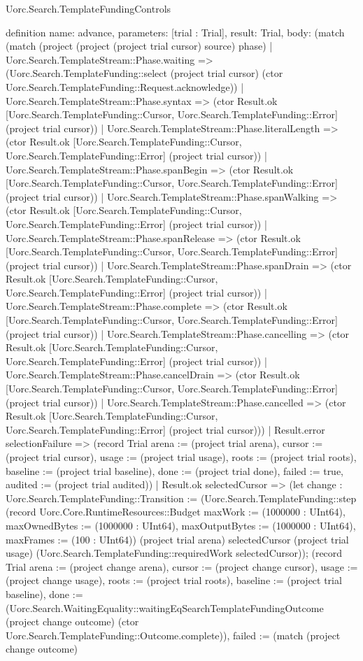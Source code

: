 \begin{lexlean}{Uorc.Search.TemplateFundingControls}
\begin{semanticmodule}
definition{
  name: advance,
  parameters: [trial : Trial],
  result: Trial,
  body: (match (match (project (project (project trial cursor) source) phase)
      | Uorc.Search.TemplateStream::Phase.waiting => (Uorc.Search.TemplateFunding::select (project trial cursor) (ctor Uorc.Search.TemplateFunding::Request.acknowledge))
      | Uorc.Search.TemplateStream::Phase.syntax => (ctor Result.ok [Uorc.Search.TemplateFunding::Cursor, Uorc.Search.TemplateFunding::Error] (project trial cursor))
      | Uorc.Search.TemplateStream::Phase.literalLength => (ctor Result.ok [Uorc.Search.TemplateFunding::Cursor, Uorc.Search.TemplateFunding::Error] (project trial cursor))
      | Uorc.Search.TemplateStream::Phase.spanBegin => (ctor Result.ok [Uorc.Search.TemplateFunding::Cursor, Uorc.Search.TemplateFunding::Error] (project trial cursor))
      | Uorc.Search.TemplateStream::Phase.spanWalking => (ctor Result.ok [Uorc.Search.TemplateFunding::Cursor, Uorc.Search.TemplateFunding::Error] (project trial cursor))
      | Uorc.Search.TemplateStream::Phase.spanRelease => (ctor Result.ok [Uorc.Search.TemplateFunding::Cursor, Uorc.Search.TemplateFunding::Error] (project trial cursor))
      | Uorc.Search.TemplateStream::Phase.spanDrain => (ctor Result.ok [Uorc.Search.TemplateFunding::Cursor, Uorc.Search.TemplateFunding::Error] (project trial cursor))
      | Uorc.Search.TemplateStream::Phase.complete => (ctor Result.ok [Uorc.Search.TemplateFunding::Cursor, Uorc.Search.TemplateFunding::Error] (project trial cursor))
      | Uorc.Search.TemplateStream::Phase.cancelling => (ctor Result.ok [Uorc.Search.TemplateFunding::Cursor, Uorc.Search.TemplateFunding::Error] (project trial cursor))
      | Uorc.Search.TemplateStream::Phase.cancelDrain => (ctor Result.ok [Uorc.Search.TemplateFunding::Cursor, Uorc.Search.TemplateFunding::Error] (project trial cursor))
      | Uorc.Search.TemplateStream::Phase.cancelled => (ctor Result.ok [Uorc.Search.TemplateFunding::Cursor, Uorc.Search.TemplateFunding::Error] (project trial cursor)))
    | Result.error selectionFailure => (record Trial {arena := (project trial arena), cursor := (project trial cursor), usage := (project trial usage), roots := (project trial roots), baseline := (project trial baseline), done := (project trial done), failed := true, audited := (project trial audited)})
    | Result.ok selectedCursor => (let change : Uorc.Search.TemplateFunding::Transition := (Uorc.Search.TemplateFunding::step (record Uorc.Core.RuntimeResources::Budget {maxWork := (1000000 : UInt64), maxOwnedBytes := (1000000 : UInt64), maxOutputBytes := (1000000 : UInt64), maxFrames := (100 : UInt64)}) (project trial arena) selectedCursor (project trial usage) (Uorc.Search.TemplateFunding::requiredWork selectedCursor)); (record Trial {arena := (project change arena), cursor := (project change cursor), usage := (project change usage), roots := (project trial roots), baseline := (project trial baseline), done := (Uorc.Search.WaitingEquality::waitingEqSearchTemplateFundingOutcome (project change outcome) (ctor Uorc.Search.TemplateFunding::Outcome.complete)), failed := (match (project change outcome)
}}
\end{semanticmodule}
\end{lexlean}
